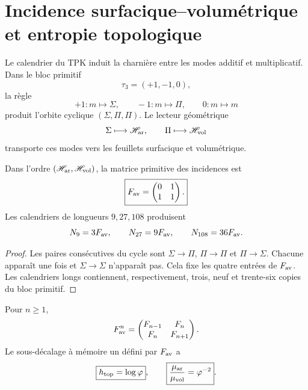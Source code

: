 \section{Incidence surfacique--volumétrique et entropie topologique}

Le calendrier du TPK induit la charnière entre les modes additif et
multiplicatif. Dans le bloc primitif
\[
 \tau_3=(+1,-1,0),
\]
la règle
\[
 +1:m\mapsto\Sigma,
 \qquad
 -1:m\mapsto\Pi,
 \qquad
 0:m\mapsto m
\]
produit l’orbite cyclique \((\Sigma,\Pi,\Pi)\). Le lecteur géométrique
\[
 \Sigma\longmapsto\mathscr H_{\rm ar},
 \qquad
 \Pi\longmapsto\mathscr H_{\rm vol}
\]
transporte ces modes vers les feuillets surfacique et volumétrique.

\begin{theorem}
\label{thm:incidencia-hojas-anexo}
Dans l’ordre \((\mathscr H_{\rm ar},\mathscr H_{\rm vol})\), la matrice
primitive des incidences est
\begin{equation}
 \boxed{
 F_{\rm av}=
 \begin{pmatrix}0&1\\1&1\end{pmatrix}.}
 \label{eq:fav-anexo-informacion}
\end{equation}
Les calendriers de longueurs \(9,27,108\) produisent
\[
 N_9=3F_{\rm av},
 \qquad N_{27}=9F_{\rm av},
 \qquad N_{108}=36F_{\rm av}.
\]
\end{theorem}

\begin{proof}
Les paires consécutives du cycle sont
\(\Sigma\to\Pi\), \(\Pi\to\Pi\) et \(\Pi\to\Sigma\). Chacune apparaît une
fois et \(\Sigma\to\Sigma\) n’apparaît pas. Cela fixe les quatre entrées de
\(F_{\rm av}\). Les calendriers longs contiennent, respectivement, trois,
neuf et trente-six copies du bloc primitif.
\end{proof}

\begin{theorem}
\label{thm:fibonacci-parry-anexo}
Pour \(n\geq1\),
\begin{equation}
 F_{\rm av}^{n}
 =\begin{pmatrix}F_{n-1}&F_n\\F_n&F_{n+1}\end{pmatrix}.
 \label{eq:potencias-fav-anexo}
\end{equation}
Le sous-décalage à mémoire un défini par \(F_{\rm av}\) a
\begin{equation}
 \boxed{h_{\rm top}=\log\varphi},
 \qquad
 \boxed{\frac{\mu_{\rm ar}}{\mu_{\rm vol}}=\varphi^{-2}}.
 \label{eq:entropia-parry-hojas-anexo}
\end{equation}
\end{theorem}

